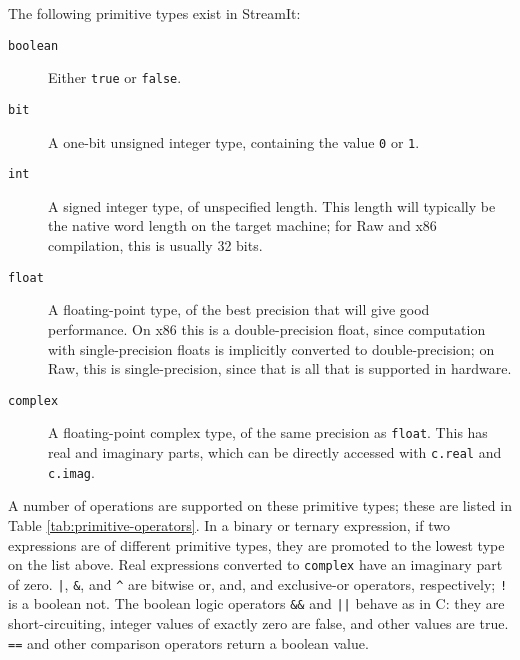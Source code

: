 \documentclass[11pt]{article}
\begin{document}
The following primitive types exist in StreamIt:

\begin{description}
\item[\lstinline|boolean|]  Either \lstinline|true| or
  \lstinline|false|.

\item[\lstinline|bit|]  A one-bit unsigned integer type, containing
  the value \lstinline|0| or \lstinline|1|.

\item[\lstinline|int|]  A signed integer type, of unspecified length.
  This length will typically be the native word length on the target
  machine; for Raw and x86 compilation, this is usually 32 bits.

\item[\lstinline|float|]  A floating-point type, of the best precision
  that will give good performance.  On x86 this is a double-precision
  float, since computation with single-precision floats is implicitly
  converted to double-precision; on Raw, this is single-precision,
  since that is all that is supported in hardware.

\item[\lstinline|complex|]  A floating-point complex type, of the same
  precision as \lstinline|float|.  This has real and imaginary parts,
  which can be directly accessed with \lstinline|c.real| and
  \lstinline|c.imag|.
\end{description}

\label{sec:operators}
A number of operations are supported on these primitive types; these
are listed in Table \ref{tab:primitive-operators}.  In a binary or
ternary expression, if two expressions are of different primitive
types, they are promoted to the lowest type on the list above.  Real
expressions converted to \lstinline|complex| have an imaginary part of
zero.  \lstinline/|/, \lstinline|&|, and \lstinline|^| are bitwise or,
and, and exclusive-or operators, respectively; \lstinline|!| is a
boolean not.  The boolean logic
operators \lstinline|&&| and \lstinline/||/ behave as in C: they are
short-circuiting, integer values of exactly zero are false, and other
values are true.  \lstinline|==| and other comparison operators return
a boolean value.
\end{document}
